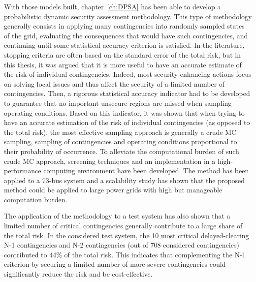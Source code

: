 With those models built, chapter~\ref{ch:DPSA} has been able to develop a probabilistic dynamic security assessment methodology. This type of methodology generally consists in applying many contingencies into randomly sampled states of the grid, evaluating the consequences that would have such contingencies, and continuing until some statistical accuracy criterion is satisfied. In the literature, stopping criteria are often based on the standard error of the total risk, but in this thesis, it was argued that it is more useful to have an accurate estimate of the risk of individual contingencies. Indeed, most security-enhancing actions focus on solving local issues and thus affect the security of a limited number of contingencies. Then, a rigorous statistical accuracy indicator had to be developed to guarantee that no important unsecure regions are missed when sampling operating conditions. Based on this indicator, it was shown that when trying to have an accurate estimation of the risk of individual contingencies (as opposed to the total risk), the most effective sampling approach is generally a crude MC sampling, \ie sampling of contingencies and operating conditions proportional to their probability of occurrence. To alleviate the computational burden of such crude MC approach, screening techniques and an implementation in a high-performance computing environment have been developed. The method has been applied to a 73-bus system and a scalability study has shown that the proposed method could be applied to large power grids with high but manageable computation burden.

The application of the methodology to a test system has also shown that a limited number of critical contingencies generally contribute to a large share of the total risk. In the considered test system, the 10 most critical delayed-clearing N-1 contingencies and N-2 contingencies (out of 708 considered contingencies) contributed to 44\% of the total risk. This indicates that complementing the N-1 criterion by securing a limited number of more severe contingencies could significantly reduce the risk and be cost-effective.

